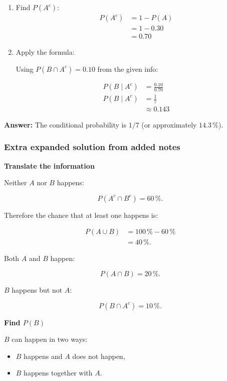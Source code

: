 \documentclass[10pt]{article}
\begin{document}
\begin{enumerate}
\item Find $P(A^c)$:
\begin{align*}
P(A^c)
&= 1-P(A) \\[2mm]
&= 1-0.30 \\[2mm]
&= 0.70
\end{align*}

\item Apply the formula:

Using $P(B \cap A^c)=0.10$ from the given info:

\begin{align*}
P(B\mid A^c)
&= \frac{0.10}{0.70} \\[2mm]
P(B\mid A^c)
&= \frac{1}{7} \\[2mm]
&\approx 0.143
\end{align*}
\end{enumerate}

\textbf{Answer:}
The conditional probability is $1/7$
(or approximately $14.3\,\%$).

\subsubsection*{Extra expanded solution from added notes}

\textbf{Translate the information}

Neither $A$ nor $B$ happens:

\[
P(A^c\cap B^c)=60\,\%.
\]

Therefore the chance that at least one happens is:

\begin{align*}
P(A\cup B)
&=100\,\%-60\,\% \\[2mm]
&=40\,\%.
\end{align*}

Both $A$ and $B$ happen:

\[
P(A\cap B)=20\,\%.
\]

$B$ happens but not $A$:

\[
P(B\cap A^c)=10\,\%.
\]

\textbf{Find $P(B)$}

$B$ can happen in two ways:

\begin{itemize}
\item $B$ happens and $A$ does not happen,
\item $B$ happens together with $A$.
\end{itemize}
\end{document}
